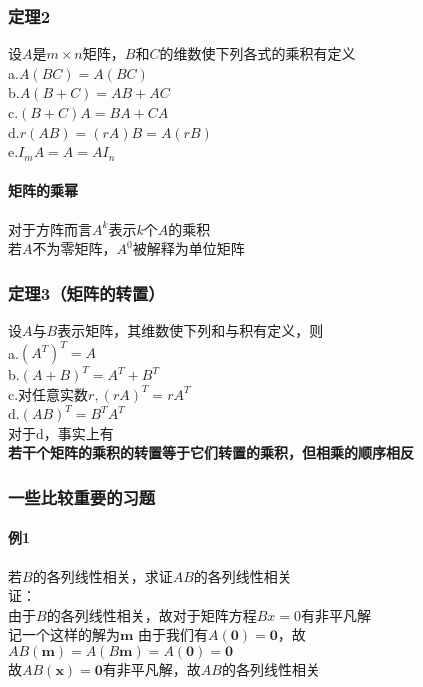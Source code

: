 \documentclass{article}
\newcommand{\ve}{\boldsymbol}
\begin{document}
\begin{CJK}{UTF8}{gkai}
\subsubsection{定理2}
设$A$是$m\times n$矩阵，$B$和$C$的维数使下列各式的乘积有定义\\
a.$A(BC)=A(BC)$\\
b.$A(B+C)=AB+AC$\\
c.$(B+C)A=BA+CA$\\
d.$r(AB)=(rA)B=A(rB)$\\
e.$I_m A=A=A I_n$\\
\paragraph{矩阵的乘幂\\}
对于方阵而言$A^k$表示$k$个$A$的乘积\\
若$A$不为零矩阵，$A^0$被解释为单位矩阵\\
\subsubsection{定理3（矩阵的转置）}
设$A$与$B$表示矩阵，其维数使下列和与积有定义，则\\
a.$(A^T)^T=A$\\
b.$(A+B)^T=A^T+B^T$\\
c.对任意实数$r,(rA)^T=rA^T$\\
d.$(AB)^T=B^T A^T$\\
对于d，事实上有\\
\textbf{若干个矩阵的乘积的转置等于它们转置的乘积，但相乘的顺序相反}\\
\subsubsection{一些比较重要的习题}
\paragraph{例1\\}
若$B$的各列线性相关，求证$AB$的各列线性相关\\

证：\\
由于$B$的各列线性相关，故对于矩阵方程$Bx=0$有非平凡解\\
记一个这样的解为$\ve{m}$
由于我们有$A(\ve{0})=\ve{0}$，故$AB(\ve{m})=A(B\ve{m})=A(\ve{0})=\ve{0}$\\
故$AB(\ve{x})=\ve{0}$有非平凡解，故$AB$的各列线性相关\\


\end{CJK}
\end{document}
